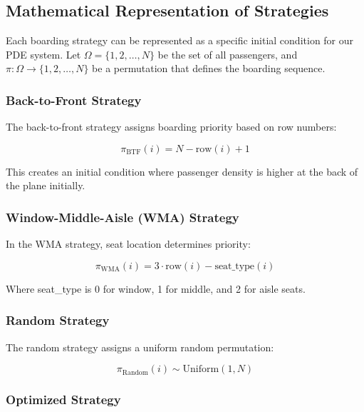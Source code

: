 \documentclass[a4paper,12pt]{article}
\begin{document}
\subsection{Mathematical Representation of Strategies}

Each boarding strategy can be represented as a specific initial condition for our PDE system. Let $\Omega = \{1, 2, \ldots, N\}$ be the set of all passengers, and $\pi: \Omega \rightarrow \{1, 2, \ldots, N\}$ be a permutation that defines the boarding sequence.

\subsubsection{Back-to-Front Strategy}

The back-to-front strategy assigns boarding priority based on row numbers:

\begin{equation}
\pi_{\text{BTF}}(i) = N - \text{row}(i) + 1
\end{equation}

This creates an initial condition where passenger density is higher at the back of the plane initially.

\subsubsection{Window-Middle-Aisle (WMA) Strategy}

In the WMA strategy, seat location determines priority:

\begin{equation}
\pi_{\text{WMA}}(i) = 3 \cdot \text{row}(i) - \text{seat\_type}(i)
\end{equation}

Where seat\_type is 0 for window, 1 for middle, and 2 for aisle seats.

\subsubsection{Random Strategy}

The random strategy assigns a uniform random permutation:

\begin{equation}
\pi_{\text{Random}}(i) \sim \text{Uniform}(1, N)
\end{equation}

\subsubsection{Optimized Strategy}
\end{document}
